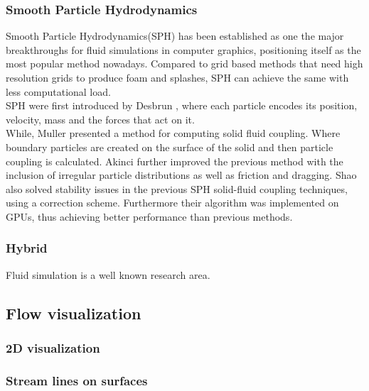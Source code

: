 \documentclass[11pt]{report}
\begin{document}
\subsubsection{Smooth Particle Hydrodynamics}

Smooth Particle Hydrodynamics(SPH) has been established as one the major breakthroughs for fluid simulations in computer graphics, positioning itself as the most popular method nowadays.
Compared to grid based methods that need high resolution grids to produce foam and splashes, SPH can achieve the same with less computational load.\\

SPH were first introduced by Desbrun \cite{DesbrunMathieuandGascuel1996}, where each particle encodes its position, velocity, mass and the forces that act on it.\\

While, Muller \cite{Muller2004} presented a method for computing solid fluid coupling. Where boundary particles are created on the surface of the solid and then particle coupling is calculated.
Akinci \cite{Akinci2012} further improved the previous method with the inclusion of irregular particle distributions as well as friction and dragging. 
Shao \cite{Shao2014} also solved stability issues in the previous SPH solid-fluid coupling techniques, using a correction scheme.
Furthermore their algorithm was implemented on GPUs, thus achieving better performance than previous methods.  

\subsubsection{Hybrid}

Fluid simulation is a well known research area. 


\subsection{Flow visualization}


\subsubsection{2D visualization}

\subsubsection{Stream lines on surfaces}
\end{document}
